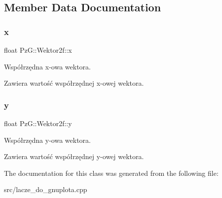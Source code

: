 \subsection{Member Data Documentation}
\mbox{\label{class_pz_g_1_1_wektor2f_aacbc07ae23c748a3378c09353b0b3c4c}} 
\subsubsection{\texorpdfstring{x}{x}}
{\footnotesize\ttfamily float Pz\+G\+::\+Wektor2f\+::x}



Współrzędna x-\/owa wektora. 

Zawiera wartość współrzędnej x-\/owej wektora. \mbox{\label{class_pz_g_1_1_wektor2f_a7bea23077e29c234ff5b9fdc4f436fb8}} 
\subsubsection{\texorpdfstring{y}{y}}
{\footnotesize\ttfamily float Pz\+G\+::\+Wektor2f\+::y}



Współrzędna y-\/owa wektora. 

Zawiera wartość współrzędnej y-\/owej wektora. 

The documentation for this class was generated from the following file\+:\begin{DoxyCompactItemize}
\item 
src/lacze\+\_\+do\+\_\+gnuplota.\+cpp\end{DoxyCompactItemize}
